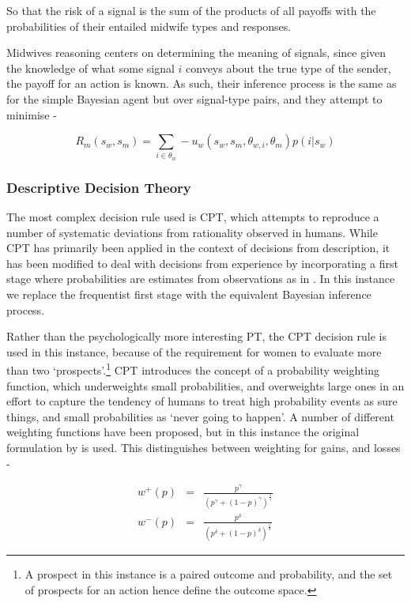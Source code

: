 So that the risk of a signal is the sum of the products of all payoffs with the probabilities of their entailed midwife types and responses.

Midwives reasoning centers on determining the meaning of signals, since given the knowledge of what some signal \(i\) conveys about the true type of the sender, the payoff for an action is known. As such, their inference process is the same as for the simple Bayesian agent but over signal-type pairs, and they attempt to minimise -

\begin{equation}
R_{m}(s_{w}, s_{m}) = \sum_{i\in \theta_{w}} -u_{w}(s_{w}, s_{m}, \theta_{w, i}, \theta_{m})p(i | s_{w})
\end{equation}

\subsubsection{Descriptive Decision Theory}

The most complex decision rule used is \ac{CPT}, which attempts to reproduce a number of systematic deviations from rationality observed in humans. While \ac{CPT} has primarily been applied in the context of decisions from description, it has been modified to deal with decisions from experience by incorporating a first stage where probabilities are estimates from observations as in \cite{FoxCPT}. In this instance we replace the frequentist first stage with the equivalent Bayesian inference process.

Rather than the psychologically more interesting \ac{PT}, the \ac{CPT}
decision rule is used in this instance, because of the requirement
for women to evaluate more than two `prospects'.\footnote{A prospect in this instance is a paired outcome and probability, and the set of prospects
for an action hence define the outcome space.} \ac{CPT} introduces
the concept of a probability weighting function, which underweights
small probabilities, and overweights large ones in an effort to capture
the tendency of humans to treat high probability events as sure things,
and small probabilities as `never going to happen'. A number of different
weighting functions have been proposed, but in this instance the original
formulation by \citet{Tversky1992} is used. This distinguishes between
weighting for gains, and losses -

\begin{eqnarray*}
w^{+}(p) & = & \frac{p^{\gamma}}{(p^{\gamma}+(1-p)^{\gamma})^{\frac{1}{\gamma}}}\\
w^{-}(p) & = & \frac{p^{\delta}}{(p^{\delta}+(1-p)^{\delta})^{\frac{1}{\delta}}}
\end{eqnarray*}


